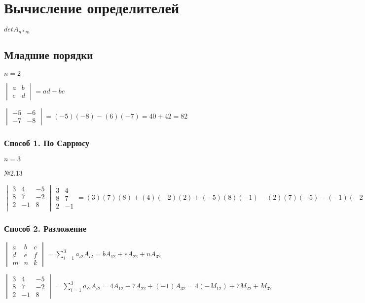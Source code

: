 \documentclass{article}
\begin{document}
\section{Вычисление определителей}

$detA_{n*m}$

\subsection{Младшие порядки}
$
n = 2
$

$
\begin{vmatrix}
	a & b \\
	c & d
\end{vmatrix}
= ad - bc
$

$
\begin{vmatrix}
	-5 & -6 \\
	-7 & -8
\end{vmatrix}
= (-5)(-8) - (6)(-7) = 40 + 42 = 82
$

\subsubsection{Способ 1. По Саррюсу}
$
n = 3
$

№2.13

$
\begin{vmatrix}
	3 & 4 & -5 \\
	8 & 7 & -2 \\
	2 & -1 & 8 \\	
\end{vmatrix}
\begin{matrix}
	3 & 4 \\
	8 & 7 \\
	2 & -1
\end{matrix}
= (3)(7)(8) + (4)(-2)(2) + (-5)(8)(-1) - (2)(7)(-5) - (-1)(-2)(3) - (8)(8)(4) =
168 - 16 + 40 + 70 - 6 - 256 = 0
$

\subsubsection{Способ 2. Разложение}

$
\begin{vmatrix}
	a & b & c \\
	d & e & f \\
	m & n & k	
\end{vmatrix}
= \sum_{i=1}^{3} a_{i2} A_{i2} =
bA_{12} + eA_{22} + nA_{32}
$

$
\begin{vmatrix}
	3 & 4 & -5 \\
	8 & 7 & -2 \\
	2 & -1 & 8
\end{vmatrix}
= \sum_{i=1}^{3} a_{i2} A_{i2} =
4A_{12} + 7A_{22} + (-1)A_{32} =
4(-M_{12}) + 7M_{22} + M_{32}
$
\end{document}
